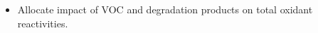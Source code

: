 \begin{BlueBox}
    \vskip-1cm
    \begin{block}{}
        \begin{itemize}
            \item Allocate impact of VOC and degradation products on total oxidant reactivities.
        \end{itemize}
        \begin{figure}
            \vskip-1cm
            \begin{center}
                \def\svgwidth{\textwidth}
                 \vskip-2cm
            \end{center}
        \end{figure}
    \end{block}
\end{BlueBox}
